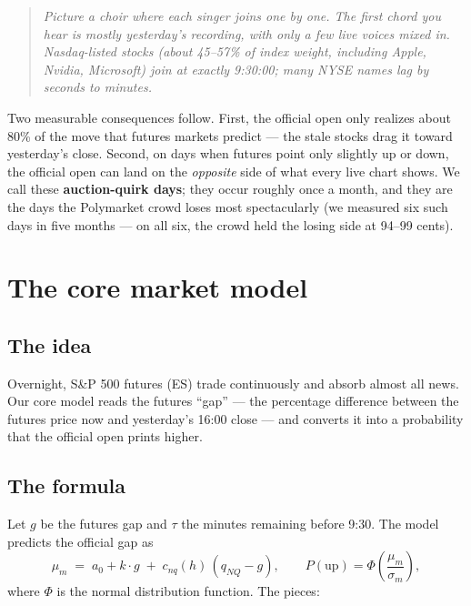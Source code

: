 \documentclass[11pt,a4paper]{article}
\newcommand{\intuition}[1]{\begin{quote}\small\itshape #1\end{quote}}
\begin{document}
\intuition{Picture a choir where each singer joins one by one. The first chord
you hear is mostly yesterday's recording, with only a few live voices mixed in.
Nasdaq-listed stocks (about 45--57\% of index weight, including Apple, Nvidia,
Microsoft) join at exactly 9:30:00; many NYSE names lag by seconds to minutes.}

Two measurable consequences follow. First, the official open only realizes
about 80\% of the move that futures markets predict --- the stale stocks drag it
toward yesterday's close. Second, on days when futures point only slightly up
or down, the official open can land on the \emph{opposite} side of what every
live chart shows. We call these \textbf{auction-quirk days}; they occur roughly
once a month, and they are the days the Polymarket crowd loses most
spectacularly (we measured six such days in five months --- on all six, the
crowd held the losing side at 94--99 cents).

\section{The core market model}

\subsection{The idea}

Overnight, S\&P 500 futures (ES) trade continuously and absorb almost all news.
Our core model reads the futures ``gap'' --- the percentage difference between
the futures price now and yesterday's 16:00 close --- and converts it into a
probability that the official open prints higher.

\subsection{The formula}

Let $g$ be the futures gap and $\tau$ the minutes remaining before 9:30. The
model predicts the official gap as
\[
\mu_m \;=\; a_0 + k \cdot g \;+\; c_{nq}(h)\,(q_{NQ}-g),
\qquad
P(\text{up}) = \Phi\!\left(\frac{\mu_m}{\sigma_m}\right),
\]
where $\Phi$ is the normal distribution function. The pieces:
\end{document}

